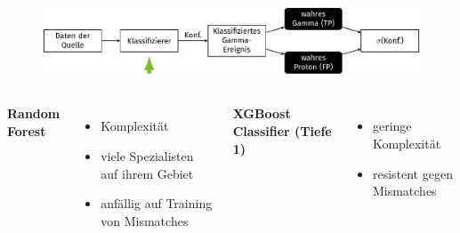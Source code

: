 \documentclass[aspectratio=1610, professionalfonts, 9pt]{beamer}
\begin{document}
\begin{frame}
  \begin{minipage}[t][0.25\textheight][t]{\textwidth}
	\begin{figure}
	  \includegraphics[scale=0.5]{./tikz/Conf/Conf2.pdf}
	\end{figure}
  \end{minipage}
  \begin{minipage}[t][0.10\textheight][t]{\textwidth}
  \end{minipage}
  \begin{minipage}[t][0.65\textheight][t]{\textwidth}
	\begin{columns}[onlytextwidth]
	  \Large \bf Random Forest
	  \begin{itemize}
		\item Komplexität
		\item viele Spezialisten auf ihrem Gebiet
		\item anfällig auf Training von Mismatches
	  \end{itemize}
	  \Large \bf XGBoost Classifier (Tiefe 1)
	  \begin{itemize}
		\item geringe Komplexität
		\item resistent gegen Mismatches
	  \end{itemize}
	\end{columns}
  \end{minipage}
\end{frame}
\end{document}
